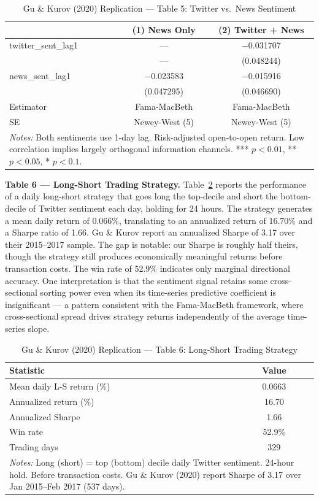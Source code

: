 \documentclass[12pt]{article}
\begin{document}
\begin{table}[htbp]
\centering
\caption{Gu \& Kurov (2020) Replication --- Table 5: Twitter vs.\ News Sentiment}
\label{tab:gk_t5}
\begin{tabular}{lcc}
\hline\hline
 & (1) News Only & (2) Twitter + News \\
\hline
twitter\_sent\_lag1 & --- & $-$0.031707 \\
 & --- & (0.048244) \\
news\_sent\_lag1 & $-$0.023583 & $-$0.015916 \\
 & (0.047295) & (0.046690) \\
\hline
Estimator & Fama-MacBeth & Fama-MacBeth \\
SE & Newey-West (5) & Newey-West (5) \\
\hline\hline
\multicolumn{3}{p{0.9\linewidth}}{\footnotesize \textit{Notes:} Both sentiments use 1-day lag. Risk-adjusted open-to-open return. Low correlation implies largely orthogonal information channels. *** $p<0.01$, ** $p<0.05$, * $p<0.1$.}
\end{tabular}
\end{table}

\textbf{Table 6 --- Long-Short Trading Strategy.} Table~\ref{tab:gk_t6} reports the performance of a daily long-short strategy that goes long the top-decile and short the bottom-decile of Twitter sentiment each day, holding for 24 hours. The strategy generates a mean daily return of 0.066\%, translating to an annualized return of 16.70\% and a Sharpe ratio of 1.66. Gu \& Kurov report an annualized Sharpe of 3.17 over their 2015--2017 sample. The gap is notable: our Sharpe is roughly half theirs, though the strategy still produces economically meaningful returns before transaction costs. The win rate of 52.9\% indicates only marginal directional accuracy. One interpretation is that the sentiment signal retains some cross-sectional sorting power even when its time-series predictive coefficient is insignificant --- a pattern consistent with the Fama-MacBeth framework, where cross-sectional spread drives strategy returns independently of the average time-series slope.

\begin{table}[htbp]
\centering
\caption{Gu \& Kurov (2020) Replication --- Table 6: Long-Short Trading Strategy}
\label{tab:gk_t6}
\begin{tabular}{lc}
\hline\hline
Statistic & Value \\
\hline
Mean daily L-S return (\%) & 0.0663 \\
Annualized return (\%) & 16.70 \\
Annualized Sharpe & 1.66 \\
Win rate & 52.9\% \\
Trading days & 329 \\
\hline\hline
\multicolumn{2}{p{0.7\linewidth}}{\footnotesize \textit{Notes:} Long (short) = top (bottom) decile daily Twitter sentiment. 24-hour hold. Before transaction costs. Gu \& Kurov (2020) report Sharpe of 3.17 over Jan 2015--Feb 2017 (537 days).}
\end{tabular}
\end{table}
\end{document}
